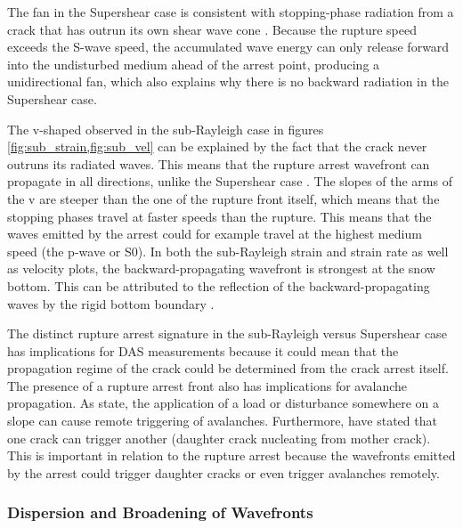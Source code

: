 The fan in the Supershear case is consistent with stopping-phase radiation from a crack that has outrun its own shear wave cone \parencite{madariagaHighfrequencyRadiationCrack1977}. Because the rupture speed exceeds the S-wave speed, the accumulated wave energy can only release forward into the undisturbed medium ahead of the arrest point, producing a unidirectional fan, which also explains why there is no backward radiation in the Supershear case. \par

The v-shaped observed in the sub-Rayleigh case in figures \ref{fig:sub_strain,fig:sub_vel} can be explained by the fact that the crack never outruns its radiated waves. This means that the rupture arrest wavefront can propagate in all directions, unlike the Supershear case \parencite{freundDynamicFractureMechanics1998}. The slopes of the arms of the v are steeper than the one of the rupture front itself, which means that the stopping phases travel at faster speeds than the rupture. This means that the waves emitted by the arrest could for example travel at the highest medium speed (the p-wave or S0). In both the sub-Rayleigh strain and strain rate as well as velocity plots, the backward-propagating wavefront is strongest at the snow bottom. This can be attributed to the reflection of the backward-propagating waves by the rigid bottom boundary \parencite{graffWaveMotionElastic1975}. \par 

The distinct rupture arrest signature in the sub-Rayleigh versus Supershear case has implications for DAS measurements because it could mean that the propagation regime of the crack could be determined from the crack arrest itself. The presence of a rupture arrest front also has implications for avalanche propagation. As \cite{gaumeInvestigatingReleaseFlow2019,gaumeDynamicAnticrackPropagation2018} state, the application of a load or disturbance somewhere on a slope can cause remote triggering of avalanches. Furthermore, \cite{burridgeAdmissibleSpeedsPlaneStrain1973,trottetTransitionSubRayleighAnticrack2022} have stated that one crack can trigger another (daughter crack nucleating from mother crack). This is important in relation to the rupture arrest because the wavefronts emitted by the arrest could trigger daughter cracks or even trigger avalanches remotely. \par

\subsubsection{Dispersion and Broadening of Wavefronts}

